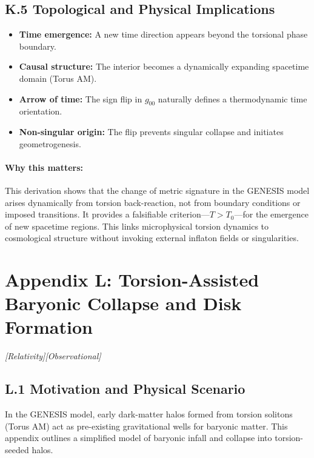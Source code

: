 \documentclass{article}
\newcommand{\obstag}{\textcolor{green!60!black}{\textit{[Observational]}}}
\newcommand{\grtag}{\textcolor{blue!40!black}{\textit{[Relativity]}}}
\begin{document}
\subsection*{K.5 Topological and Physical Implications}
\begin{itemize}
  \item \textbf{Time emergence:} A new time direction appears beyond the torsional phase boundary.
  \item \textbf{Causal structure:} The interior becomes a dynamically expanding spacetime domain (Torus AM).
  \item \textbf{Arrow of time:} The sign flip in $g_{00}$ naturally defines a thermodynamic time orientation.
  \item \textbf{Non-singular origin:} The flip prevents singular collapse and initiates geometrogenesis.
\end{itemize}

\paragraph{Why this matters:}
This derivation shows that the change of metric signature in the GENESIS model arises dynamically from torsion back-reaction, not from boundary conditions or imposed transitions. It provides a falsifiable criterion—$T > T_0$—for the emergence of new spacetime regions. This links microphysical torsion dynamics to cosmological structure without invoking external inflaton fields or singularities.





\section*{Appendix L: Torsion-Assisted Baryonic Collapse and Disk Formation}
\label{app:torsion-collapse}
\grtag  \obstag

\label{app:torsion-collapse}


\subsection*{L.1 Motivation and Physical Scenario}
In the GENESIS model, early dark-matter halos formed from torsion solitons (Torus AM) act as pre-existing gravitational wells for baryonic matter. This appendix outlines a simplified model of baryonic infall and collapse into torsion-seeded halos.
\end{document}
